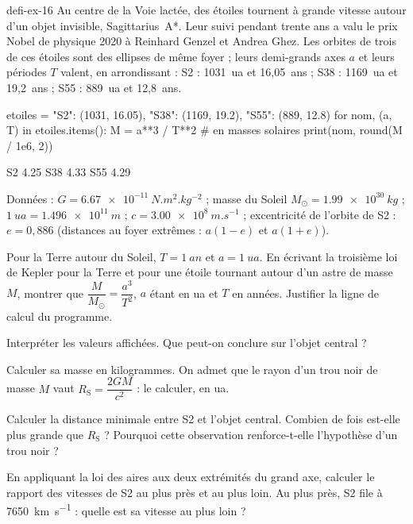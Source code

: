 \begin{blocEdition}{defi-ex-16}
Au centre de la Voie lactée, des étoiles tournent à grande vitesse autour d'un objet invisible, Sagittarius~A*. Leur
suivi pendant trente ans a valu le prix Nobel de physique 2020 à Reinhard Genzel et Andrea Ghez. Les orbites de trois de
ces étoiles sont des ellipses de même foyer ; leurs demi-grands axes $a$ et leurs périodes $T$ valent, en arrondissant :
S2 : \qty{1031}{ua} et 16,05~ans ; S38 : \qty{1169}{ua} et 19,2~ans ; S55 : \qty{889}{ua} et 12,8~ans.
\begin{codecote}[0.62]
\begin{pythoncol}
etoiles = {"S2": (1031, 16.05),
           "S38": (1169, 19.2),
           "S55": (889, 12.8)}
for nom, (a, T) in etoiles.items():
    M = a**3 / T**2          # en masses solaires
    print(nom, round(M / 1e6, 2))
\end{pythoncol}
\cote
\begin{consolecol}
S2 4.25
S38 4.33
S55 4.29
\end{consolecol}
\end{codecote}
\par\smallskip
Données : $G=\qty{6,67e-11}{N.m^2.kg^{-2}}$ ; masse du Soleil $M_\odot=\qty{1,99e30}{kg}$ ; $\qty{1}{ua}=\qty{1,496e11}{m}$ ;
$c=\qty{3,00e8}{m.s^{-1}}$ ; excentricité de l'orbite de S2 : $e=0{,}886$ (distances au foyer extrêmes : $a(1-e)$ et
$a(1+e)$).
\begin{questions}
\item Pour la Terre autour du Soleil, $T=\qty{1}{an}$ et $a=\qty{1}{ua}$. En écrivant la troisième loi de Kepler pour la Terre et
pour une étoile tournant autour d'un astre de masse $M$, montrer que $\dfrac{M}{M_\odot}=\dfrac{a^3}{T^2}$, $a$ étant en ua et $T$ en
années. Justifier la ligne de calcul du programme.
\item Interpréter les valeurs affichées. Que peut-on conclure sur l'objet central ?
\item Calculer sa masse en kilogrammes. On admet que le rayon d'un trou noir de masse $M$ vaut $R_\mathrm{S}=\dfrac{2GM}{c^2}$ :
le calculer, en ua.
\item Calculer la distance minimale entre S2 et l'objet central. Combien de fois est-elle plus grande que $R_\mathrm{S}$ ?
Pourquoi cette observation renforce-t-elle l'hypothèse d'un trou noir ?
\item En appliquant la loi des aires aux deux extrémités du grand axe, calculer le rapport des vitesses de S2 au plus près
et au plus loin. Au plus près, S2 file à \qty{7650}{km.s^{-1}} : quelle est sa vitesse au plus loin ?
\end{questions}
\end{blocEdition}

